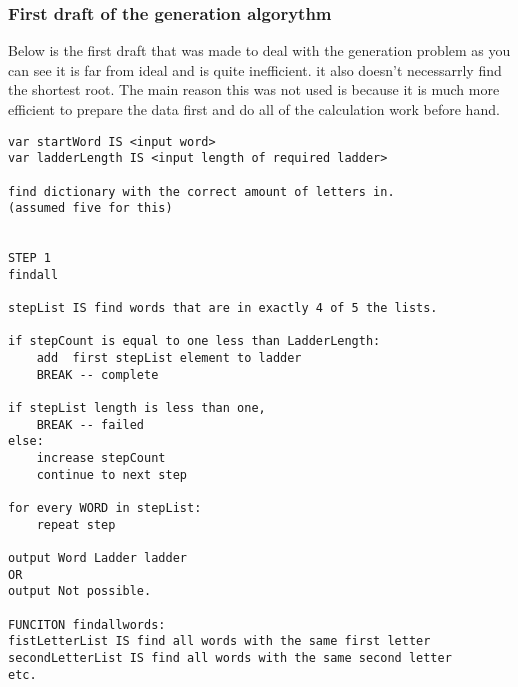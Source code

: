 \documentclass[final,a4paper,twoside,12pt]{report}
\begin{document}
\subsubsection{First draft of the generation algorythm}
Below is the first draft that was made to deal with the generation problem
as you can see it is far from ideal and is quite inefficient. it also doesn't
necessarrly find the shortest root. The main reason this was not used is
because it is much more efficient to prepare the data first and do all of the
calculation work before hand.
\begin{verbatim}
var startWord IS <input word>
var ladderLength IS <input length of required ladder>

find dictionary with the correct amount of letters in. 
(assumed five for this)


STEP 1
findall

stepList IS find words that are in exactly 4 of 5 the lists.

if stepCount is equal to one less than LadderLength:
    add  first stepList element to ladder
    BREAK -- complete

if stepList length is less than one,
    BREAK -- failed
else:
    increase stepCount
    continue to next step

for every WORD in stepList:
    repeat step

output Word Ladder ladder
OR
output Not possible.

FUNCITON findallwords:
fistLetterList IS find all words with the same first letter
secondLetterList IS find all words with the same second letter
etc.
\end{verbatim}
\end{document}
